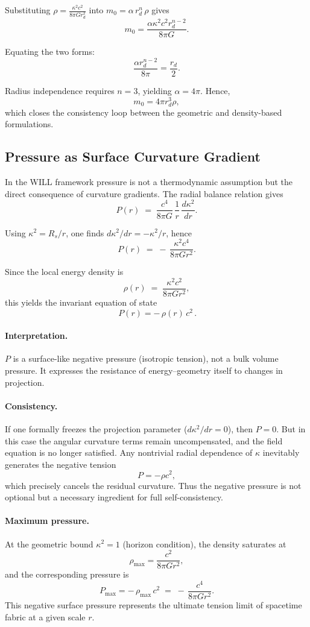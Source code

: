 \documentclass[12pt, a4paper]{article}
\begin{document}
Substituting $\rho = \frac{\kappa^2 c^2}{8\pi G r_{d}^2}$ into $m_0 = \alpha \, r_d^n \, \rho$ gives
\[
m_0 = \frac{\alpha \kappa^2 c^2 r_d^{n-2}}{8\pi G}.
\]

Equating the two forms:
\[
\frac{\alpha r_d^{n-2}}{8\pi} = \frac{r_d}{2}.
\]

Radius independence requires $n=3$, yielding $\alpha=4\pi$. Hence,
\[
m_0 = 4\pi r_d^3 \rho,
\]
which closes the consistency loop between the geometric and density-based formulations.

\subsection{Pressure as Surface Curvature Gradient}

In the WILL framework pressure is not a thermodynamic assumption but the direct consequence of curvature gradients.  
The radial balance relation gives
\[
P(r) \;=\; \frac{c^4}{8\pi G}\,\frac{1}{r}\,\frac{d\kappa^2}{dr}.
\]

Using $\kappa^2 = R_s/r$, one finds $d\kappa^2/dr = -\kappa^2/r$, hence
\[
P(r) \;=\; -\,\frac{\kappa^2 c^4}{8\pi G r^2}.
\]

Since the local energy density is
\[
\rho(r) \;=\; \frac{\kappa^2 c^2}{8\pi G r^2},
\]
this yields the invariant equation of state
\[
\boxed{\,P(r) = -\,\rho(r)\,c^2\,}.
\]

\paragraph{Interpretation.}
$P$ is a surface-like negative pressure (isotropic tension), not a bulk volume pressure.  
It expresses the resistance of energy–geometry itself to changes in projection.  

\paragraph{Consistency.}
If one formally freezes the projection parameter ($d\kappa^2/dr=0$), then $P=0$.  
But in this case the angular curvature terms remain uncompensated, and the field equation is no longer satisfied.  
Any nontrivial radial dependence of $\kappa$ inevitably generates the negative tension 
\[
P = -\rho c^2,
\]
which precisely cancels the residual curvature.  
Thus the negative pressure is not optional but a necessary ingredient for full self-consistency.

\paragraph{Maximum pressure.}
At the geometric bound $\kappa^2=1$ (horizon condition), the density saturates at
\[
\rho_{\max} = \frac{c^2}{8\pi G r^2},
\]
and the corresponding pressure is
\[
P_{\max} = -\,\rho_{\max}\,c^2 \;=\; -\,\frac{c^4}{8\pi G r^2}.
\]
This negative surface pressure represents the ultimate tension limit of spacetime fabric at a given scale $r$.
\end{document}
